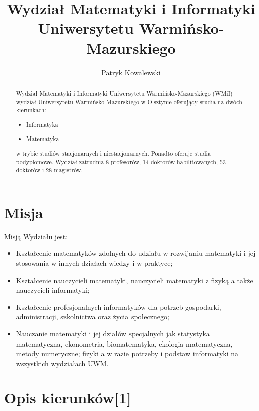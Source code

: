 \documentclass[a4paper,12pt]{article}
\title{Wydział Matematyki i Informatyki Uniwersytetu Warmińsko-Mazurskiego}
\author{Patryk Kowalewski}
\begin{document}
\maketitle

\begin{abstract}
Wydział Matematyki i Informatyki Uniwersytetu Warmińsko-Mazurskiego (WMiI) – wydział 
Uniwersytetu Warmińsko-Mazurskiego w Olsztynie oferujący studia na dwóch kierunkach:

\begin{itemize}

\item Informatyka

\item Matematyka

\end{itemize}

w trybie studiów stacjonarnych i niestacjonarnych. Ponadto oferuje studia podyplomowe.
Wydział zatrudnia 8 profesorów, 14 doktorów habilitowanych, 53 doktorów i 28 magistrów.

\end{abstract}

\section{Misja}

Misją Wydziału jest:

\begin{itemize}

\item Kształcenie matematyków zdolnych do udziału w rozwijaniu matematyki i jej stosowania w innych
działach wiedzy i w praktyce;

\item Kształcenie nauczycieli matematyki, nauczycieli matematyki z fizyką a także nauczycieli informatyki;

\item Kształcenie profesjonalnych informatyków dla potrzeb gospodarki, administracji, szkolnictwa oraz życia
społecznego;

\item Nauczanie matematyki i jej działów specjalnych jak statystyka matematyczna, ekonometria,
biomatematyka, ekologia matematyczna, metody numeryczne; fizyki a w razie potrzeby i podstaw
informatyki na wszystkich wydziałach UWM.

\end{itemize}

\section{Opis kierunków[1]}
\end{document}
